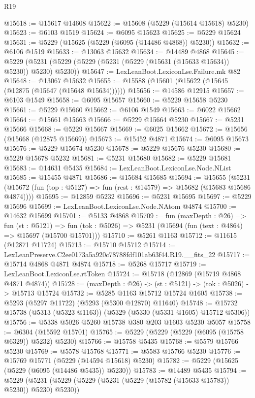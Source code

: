 \begin{lexlean}{R19}
\begin{coremodule}
@15618 := @15617 @14608
@15622 := @15608 (@5229 (@15614 @15618) @5230)
@15623 := @6103 @1519
@15624 := @6095 @15623
@15625 := @5229 @15624
@15631 := @5229 (@15625 (@5229 (@6095 (@14486 @4868)) @5230))
@15632 := @6106 @1519
@15633 := @13063 @15632
@15634 := @14489 @4868
@15645 := @5229 (@5231 (@5229 (@5229 (@5231 (@5229 (@15631 (@15633 @15634)) @5230)) @5230) @5230))
@15647 := LexLeanBoot.LexiconLse.Failure.mk @82
@15648 := @13067 @15632
@15655 := @15588 (@15601 (@15622 (@15645 (@12875 (@15647 (@15648 @15634))))))
@15656 := @14586 @12915
@15657 := @6103 @1549
@15658 := @6095 @15657
@15660 := @5229 @15658 @5230
@15661 := @5229 @15660
@15662 := @6106 @1549
@15663 := @6022 @15662
@15664 := @15661 @15663
@15666 := @5229 @15664 @5230
@15667 := @5231 @15666
@15668 := @5229 @15667
@15669 := @6025 @15662
@15672 := @15656 (@15668 (@12875 @15669))
@15673 := @15452 @4871
@15674 := @6095 @15673
@15676 := @5229 @15674 @5230
@15678 := @5229 @15676 @5230
@15680 := @5229 @15678 @5232
@15681 := @5231 @15680
@15682 := @5229 @15681
@15683 := @14631 @5435
@15684 := LexLeanBoot.LexiconLse.Node.NList
@15685 := @15455 @4871
@15686 := @15684 @15685
@15694 := @15655
    (@5231 (@15672 (fun (top : @5127) => fun (rest : @14579) => @15682 (@15683 @15686 @4874))))
@15695 := @12859 @5232
@15696 := @5231 @15695
@15697 := @5229 @15696
@15699 := LexLeanBoot.LexiconLse.Node.NAtom @4874
@15700 := @14632 @15699
@15701 := @5133 @4868
@15709 := fun (maxDepth : @26) =>
  fun (st : @5121) =>
  fun (tok : @5026) => @5231 (@15694 (fun (text : @4864) => @15697 (@15700 @15701)))
@15710 := @5261 @1163
@15712 := @11615 (@12871 @11724)
@15713 := @15710 @15712
@15714 := LexLeanPreserve.C2ee0173a5a920c78788fdf101ab63f44.R19.__fits_22
@15717 := @15714 @4868 @4871 @4874
@15718 := @5268 @15717
@15719 := LexLeanBoot.LexiconLse.rtToken
@15724 := @15718 (@12869 (@15719 @4868 @4871 @4874))
@15728 := (maxDepth : @26) -> (st : @5121) -> (tok : @5026) -> @15713 @15724
@15732 := @5285 @1163 @15712 @15724 @1605
@15738 := @5293 (@5297 @11722) (@5293 (@5300 @12870) @11640)
@15748 := @15732 @15738 (@5313 (@5323 @1163)) (@5329 (@5330 (@5331 @1605) @15712 @5306))
@15756 := @5338 @5026 @5260 @15738 @380 @203 @1603 @5230 @5057
@15758 := @6304 (@15592 @15701)
@15765 := @5229 (@5229 (@5229 (@6095 (@15758 @6329)) @5232) @5230)
@15766 := @15758 @5435
@15768 := @5579 @15766 @5230
@15769 := @5578 @15768
@15771 := @5583 @15766 @5230
@15776 := @15769 @15771 (@5229 (@14594 @15618) @5230)
@15782 := @5229 (@15625 (@5229 (@6095 (@14486 @5435)) @5230))
@15783 := @14489 @5435
@15794 := @5229 (@5231 (@5229 (@5229 (@5231 (@5229 (@15782 (@15633 @15783)) @5230)) @5230) @5230))

\end{coremodule}
\end{lexlean}
